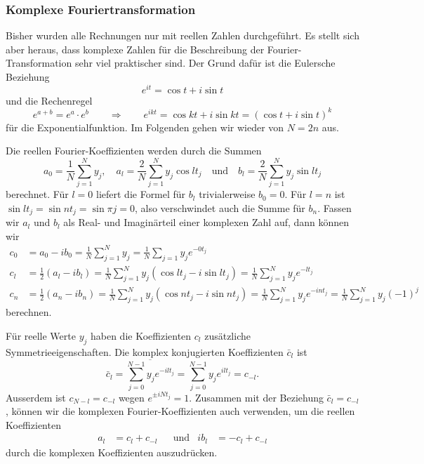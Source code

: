%
%
%
\subsubsection{Komplexe Fouriertransformation}
Bisher wurden alle Rechnungen nur mit reellen Zahlen durchgeführt.
Es stellt sich aber heraus, dass komplexe Zahlen für die Beschreibung
der Fourier-Transformation sehr viel praktischer sind.
Der Grund dafür ist die Eulersche Beziehung
%
\[
e^{it} = \cos t + i \sin t
\]
und die Rechenregel
\[
e^{a+b}=e^a\cdot e^b
\qquad\Rightarrow\qquad
e^{ikt}=\cos kt+i\sin kt = (\cos t + i \sin t)^k
\]
für die Exponentialfunktion.
Im Folgenden gehen wir wieder von $N=2n$ aus.

Die reellen Fourier-Koeffizienten werden durch die Summen
\[
a_0
=
\frac{1}{N}\sum_{j=1}^N y_j,\quad
a_l
=
\frac{2}{N}\sum_{j=1}^N y_j \cos lt_j
\quad\text{und}\quad
b_l
=
\frac{2}{N}\sum_{j=1}^N y_j \sin lt_j
\]
berechnet.
Für $l=0$ liefert die Formel für $b_l$ trivialerweise $b_0=0$.
Für $l=n$ ist $\sin lt_j = \sin nt_j = \sin \pi j=0$, also verschwindet auch
die Summe für $b_n$.
Fassen wir $a_l$ und $b_l$ als Real- und Imaginärteil einer komplexen
Zahl auf, dann können wir 
\begin{align}
c_0
&=
a_0-ib_0
=
\frac{1}{N}
\sum_{j=1}^N y_j
=
\frac{1}{N}
\sum_{j=1} y_j e^{-0t_j}
\label{skript:complex:c0}
\\
c_l
&=
\frac12(a_l-ib_l)
=
\frac{1}{N} \sum_{j=1}^N y_j (\cos lt_j - i \sin lt_j)
=
\frac1{N} \sum_{j=1}^N y_j e^{-lt_j}
\label{skript:complex:cl}
\\
c_n
&=
\frac12(a_n-ib_n)
=
\frac{1}{N} \sum_{j=1}^N y_j (\cos nt_j  -i\sin nt_j)
=
\frac{1}{N} \sum_{j=1}^N y_j e^{-int_j}
=
\frac{1}{N} \sum_{j=1}^N y_j (-1)^j
\label{skript:complex:cn}
\end{align}
berechnen.

Für reelle Werte $y_j$ haben die Koeffizienten $c_l$ zusätzliche
Symmetrieeigenschaften.
Die komplex konjugierten Koeffizienten $\bar c_l$ ist
\[
\bar c_l
=
\overline{\sum_{j=0}^{N-1} y_j e^{-ilt_j}}
=
\sum_{j=0}^{N-1} y_j e^{ilt_j}
=
c_{-l}.
\]
Ausserdem ist $c_{N-l}=c_{-l}$ wegen $e^{\pm iNt_j}=1$.
Zusammen mit der Beziehung $\bar c_l=c_{-l}$, können wir die komplexen
Fourier-Koeffizienten auch verwenden, um die reellen Koeffizienten
\begin{equation}
\begin{aligned}
a_l
&=
c_l + c_{-l}
&&\text{und}&
ib_l
&=
-c_l + c_{-l}
\end{aligned}
\end{equation}
durch die komplexen Koeffizienten auszudrücken.

